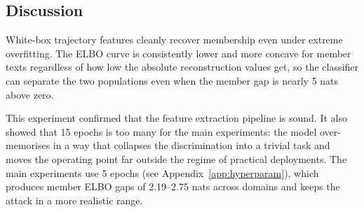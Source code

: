 \subsection*{Discussion}

White-box trajectory features cleanly recover membership even under extreme overfitting.
The ELBO curve is consistently lower and more concave for member texts regardless of
how low the absolute reconstruction values get, so the classifier can separate the two
populations even when the member gap is nearly 5 nats above zero.

This experiment confirmed that the feature extraction pipeline is sound.
It also showed that 15 epochs is too many for the main experiments: the model
over-memorises in a way that collapses the discrimination into a trivial task
and moves the operating point far outside the regime of practical deployments.
The main experiments use 5 epochs (see Appendix~\ref{app:hyperparam}),
which produces member ELBO gaps of 2.19--2.75 nats across domains and keeps
the attack in a more realistic range.
